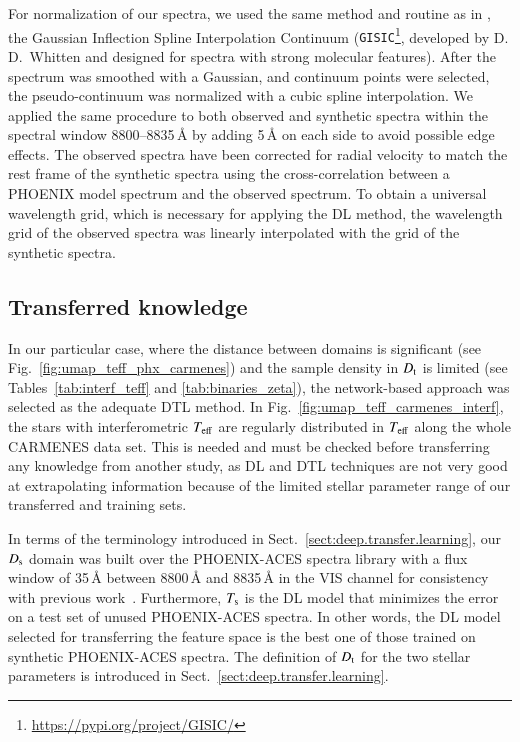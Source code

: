 \documentclass{aa}
\begin{document}
For normalization of our spectra, we used the same method and routine as in \cite{Passegger2020}, the Gaussian Inflection Spline Interpolation Continuum ({\tt GISIC}\footnote{\url{https://pypi.org/project/GISIC/}}, developed by D.\,D.~Whitten and designed for spectra with strong molecular features). 
After the spectrum was smoothed with a Gaussian, and continuum points were selected, the pseudo-continuum was normalized with a cubic spline interpolation. 
We applied the same procedure to both observed and synthetic spectra within the spectral window 8800--8835\,\AA{} by adding 5\,\AA{} on each side to avoid possible edge effects.
The observed spectra have been corrected for radial velocity to match the rest frame of the synthetic spectra using the cross-correlation \citep[crosscorrRV from PyAstronomy,][]{Czesla2019} between a PHOENIX model spectrum and the observed spectrum. To obtain a universal wavelength grid, which is necessary for applying the DL method, the wavelength grid of the observed spectra was linearly interpolated with the grid of the synthetic spectra.


\subsection{Transferred knowledge}
\label{transferred.knowledge}
In our particular case, where the distance between domains is significant (see Fig.~\ref{fig:umap_teff_phx_carmenes}) and the sample density in $D_{\rm t}$ is limited (see Tables~\ref{tab:interf_teff} and \ref{tab:binaries_zeta}), the network-based approach was selected as the adequate DTL method.
In Fig.~\ref{fig:umap_teff_carmenes_interf}, the stars with interferometric $T_{\rm eff}$ are regularly distributed in $T_{\rm eff}$ along the whole CARMENES data set. This is needed and must be checked before transferring any knowledge from another study, as DL and DTL techniques are not very good at extrapolating information because of the limited stellar parameter range of our transferred and training sets.

In terms of the terminology introduced in Sect.~\ref{sect:deep.transfer.learning}, our $D_{\rm s}$ domain was built over the PHOENIX-ACES spectra library \citep{Husser2013} with a flux window of 35\,{\AA} between 8800\,{\AA} and 8835\,{\AA} {in the VIS channel} for consistency with previous work~\citep{Passegger2020, Passegger2022}. Furthermore, $T_{\rm s}$ is the DL model that minimizes the error on a test set of unused PHOENIX-ACES spectra. {In other words, the DL model selected for transferring the feature space is the best one of those trained on synthetic PHOENIX-ACES spectra.}
The definition of $D_{\rm t}$ for the two stellar parameters is introduced in Sect.~\ref{sect:deep.transfer.learning}.
\end{document}
